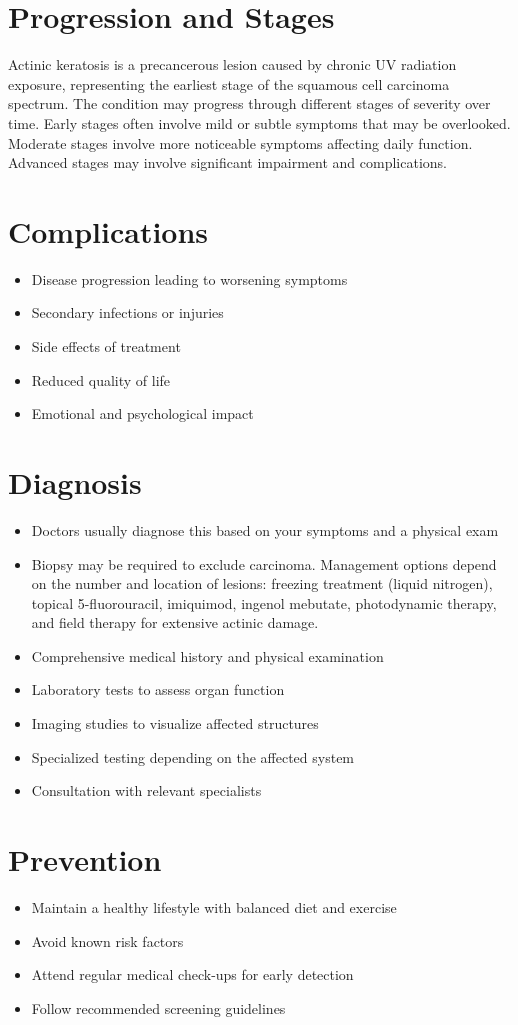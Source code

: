 \section{Progression and Stages}
Actinic keratosis is a precancerous lesion caused by chronic UV radiation exposure, representing the earliest stage of the squamous cell carcinoma spectrum. The condition may progress through different stages of severity over time. Early stages often involve mild or subtle symptoms that may be overlooked. Moderate stages involve more noticeable symptoms affecting daily function. Advanced stages may involve significant impairment and complications.
\section{Complications}
\begin{itemize}[noitemsep]
  \item Disease progression leading to worsening symptoms
  \item Secondary infections or injuries
  \item Side effects of treatment
  \item Reduced quality of life
  \item Emotional and psychological impact
\end{itemize}
\section{Diagnosis}
\begin{itemize}[noitemsep]
  \item Doctors usually diagnose this based on your symptoms and a physical exam
  \item Biopsy may be required to exclude carcinoma. Management options depend on the number and location of lesions: freezing treatment (liquid nitrogen), topical 5-fluorouracil, imiquimod, ingenol mebutate, photodynamic therapy, and field therapy for extensive actinic damage.
  \item Comprehensive medical history and physical examination
  \item Laboratory tests to assess organ function
  \item Imaging studies to visualize affected structures
  \item Specialized testing depending on the affected system
  \item Consultation with relevant specialists
\end{itemize}
\section{Prevention}
\begin{itemize}[noitemsep]
  \item Maintain a healthy lifestyle with balanced diet and exercise
  \item Avoid known risk factors
  \item Attend regular medical check-ups for early detection
  \item Follow recommended screening guidelines
\end{itemize}
